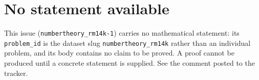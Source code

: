 \documentclass{article}
\begin{document}
\section*{No statement available}
This issue (\texttt{numbertheory\_rm14k-1}) carries no mathematical
statement: its \texttt{problem\_id} is the dataset slug
\texttt{numbertheory\_rm14k} rather than an individual problem, and its
body contains no claim to be proved. A proof cannot be produced until a
concrete statement is supplied. See the comment posted to the tracker.
\end{document}
